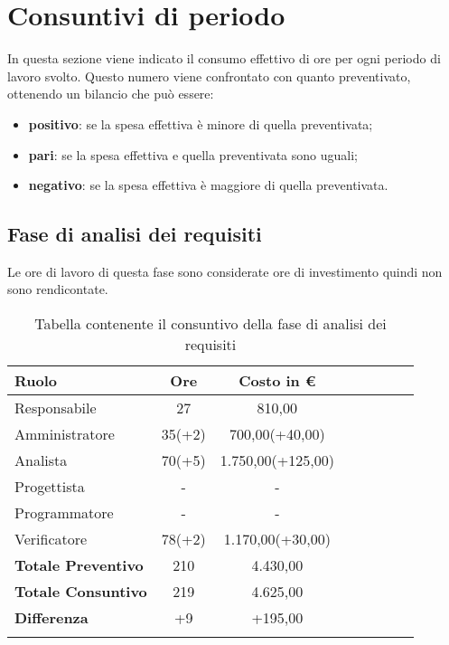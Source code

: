 \section{Consuntivi di periodo} \label{_consuntivo}
In questa sezione viene indicato il consumo effettivo di ore per ogni periodo di lavoro svolto. Questo numero viene confrontato con quanto preventivato, ottenendo un bilancio che può essere:
\begin{itemize}
	\item \textbf{positivo}: se la spesa effettiva è minore di quella preventivata;
	\item \textbf{pari}: se la spesa effettiva e quella preventivata sono uguali;
	\item \textbf{negativo}:  se la spesa effettiva è maggiore di quella preventivata.
\end{itemize}

\subsection{Fase di analisi dei requisiti} \label{_consuntivoAnalisiDeiRequisiti}
Le ore di lavoro di questa fase sono considerate ore di investimento quindi non sono rendicontate.

\begin{longtable}{|l|c|c|c|c|c|c|c|}
	\hline
	\rowcolor{lighter-grayer}
	\textbf{Ruolo}             & \textbf{Ore} & \textbf{Costo in €} \\
	\hline
	\endfirsthead

	\hline
	Responsabile               & 27           & 810,00              \\
	\hline
	\hline
	Amministratore             & 35(+2)       & 700,00(+40,00)      \\
	\hline
	\hline
	Analista                   & 70(+5)       & 1.750,00(+125,00)   \\
	\hline
	\hline
	Progettista                & -            & -                   \\
	\hline
	\hline
	Programmatore              & -            & -                   \\
	\hline
	\hline
	Verificatore               & 78(+2)       & 1.170,00(+30,00)    \\
	\hline
	\textbf{Totale Preventivo} & 210          & 4.430,00            \\
	\hline
	\hline
	\textbf{Totale Consuntivo} & 219          & 4.625,00            \\
	\hline
	\hline
	\textbf{Differenza}        & +9           & +195,00             \\
	\hline
	\rowcolor{white}
	\caption{Tabella contenente il consuntivo della fase di analisi dei requisiti}
\end{longtable}
